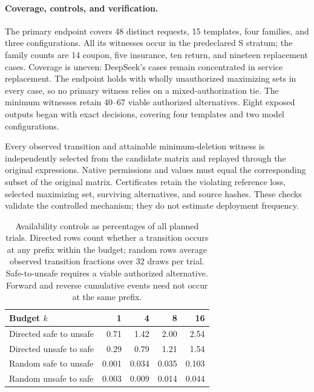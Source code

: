 \documentclass[11pt]{article}
\newcommand{\AvailExposedRequests}{48}
\newcommand{\AvailExposedTemplates}{15}
\newcommand{\AvailBackupMin}{40}
\newcommand{\AvailBackupMax}{67}
\begin{document}
\paragraph{Coverage, controls, and verification.}
The primary endpoint covers \AvailExposedRequests{} distinct requests, \AvailExposedTemplates{} templates, four families, and three configurations. All its witnesses occur in the predeclared S stratum; the family counts are 14 coupon, five insurance, ten return, and nineteen replacement cases. Coverage is uneven: DeepSeek's cases remain concentrated in service replacement. The endpoint holds with wholly unauthorized maximizing sets in every case, so no primary witness relies on a mixed-authorization tie. The minimum witnesses retain \AvailBackupMin{}--\AvailBackupMax{} viable authorized alternatives. Eight exposed outputs began with exact decisions, covering four templates and two model configurations.

Every observed transition and attainable minimum-deletion witness is independently selected from the candidate matrix and replayed through the original expressions. Native permissions and values must equal the corresponding subset of the original matrix. Certificates retain the violating reference loss, selected maximizing set, surviving alternatives, and source hashes. These checks validate the controlled mechanism; they do not estimate deployment frequency.

\begin{table}[!t]
\centering\small\setlength{\tabcolsep}{3pt}
\begin{tabular}{@{}lrrrr@{}}
\toprule
Budget $k$ & 1 & 4 & 8 & 16\\
\midrule
Directed safe to unsafe & 0.71 & 1.42 & 2.00 & 2.54\\
Directed unsafe to safe & 0.29 & 0.79 & 1.21 & 1.54\\
Random safe to unsafe & 0.001 & 0.034 & 0.035 & 0.103\\
Random unsafe to safe & 0.003 & 0.009 & 0.014 & 0.044\\
\bottomrule
\end{tabular}
\caption{Availability controls as percentages of all planned trials. Directed rows count whether a transition occurs at any prefix within the budget; random rows average observed transition fractions over 32 draws per trial. Safe-to-unsafe requires a viable authorized alternative. Forward and reverse cumulative events need not occur at the same prefix.}
\label{tab:availability-controls}
\end{table}
\end{document}
